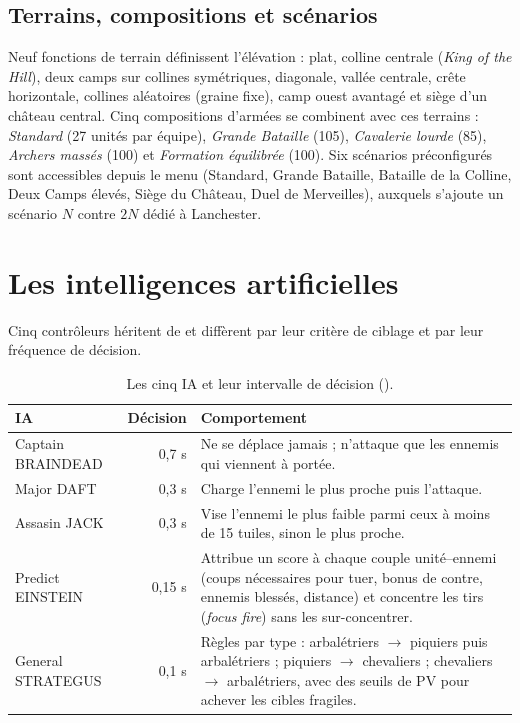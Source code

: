 \documentclass[11pt,a4paper]{article}
\newcommand{\code}[1]{\texttt{\detokenize{#1}}}
\begin{document}
\subsection{Terrains, compositions et sc\'enarios}

Neuf fonctions de terrain d\'efinissent l'\'el\'evation : plat, colline centrale (\emph{King of the Hill}), deux camps sur
collines sym\'etriques, diagonale, vall\'ee centrale, cr\^ete horizontale, collines al\'eatoires (graine fixe), camp ouest avantag\'e et
si\`ege d'un ch\^ateau central. Cinq compositions d'arm\'ees se combinent avec ces terrains : \emph{Standard} (27 unit\'es par \'equipe),
\emph{Grande Bataille} (105), \emph{Cavalerie lourde} (85), \emph{Archers mass\'es} (100) et \emph{Formation \'equilibr\'ee} (100).
Six sc\'enarios pr\'econfigur\'es sont accessibles depuis le menu (Standard, Grande Bataille, Bataille de la Colline, Deux Camps
\'elev\'es, Si\`ege du Ch\^ateau, Duel de Merveilles), auxquels s'ajoute un sc\'enario $N$ contre $2N$ d\'edi\'e \`a Lanchester.

\section{Les intelligences artificielles}

Cinq contr\^oleurs h\'eritent de \code{BaseController} et diff\`erent par leur crit\`ere de ciblage et par leur fr\'equence de d\'ecision.

\begin{table}[h]\centering\small
\begin{tabularx}{\linewidth}{@{}l r X@{}}
\toprule
IA & D\'ecision & Comportement \\
\midrule
Captain BRAINDEAD & 0,7 s & Ne se d\'eplace jamais ; n'attaque que les ennemis qui viennent \`a port\'ee. \\
Major DAFT & 0,3 s & Charge l'ennemi le plus proche puis l'attaque. \\
Assasin JACK & 0,3 s & Vise l'ennemi le plus faible parmi ceux \`a moins de 15 tuiles, sinon le plus proche. \\
Predict EINSTEIN & 0,15 s & Attribue un score \`a chaque couple unit\'e--ennemi (coups n\'ecessaires pour tuer, bonus de contre, ennemis bless\'es, distance) et concentre les tirs (\emph{focus fire}) sans les sur-concentrer. \\
General STRATEGUS & 0,1 s & R\`egles par type : arbal\'etriers $\to$ piquiers puis arbal\'etriers ; piquiers $\to$ chevaliers ; chevaliers $\to$ arbal\'etriers, avec des seuils de PV pour achever les cibles fragiles. \\
\bottomrule
\end{tabularx}
\caption{Les cinq IA et leur intervalle de d\'ecision (\code{decision_interval}).}
\end{table}
\end{document}
